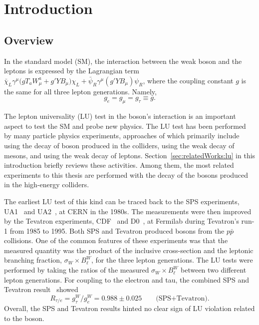 \chapter{Introduction}
\label{sec:introduction}

\section{Overview}
\label{sec:introduction:overview}

In the standard model (SM), the interaction between the weak boson and the leptons is expressed by the Lagrangian term $\bar{\chi}_L \gamma^\mu \big( g T_a W^a_\mu +g'Y B_\mu \big) \chi_L + \bar{\psi}_R \gamma^\mu (g' Y B_\mu) \psi_R $, where the coupling constant $g$ is the same for all three lepton generations. Namely,
\begin{equation*}
	g_e = g_\mu = g_\tau \equiv g.
\end{equation*}

\noindent The lepton universality (LU) test in the \PW boson's interaction is an important aspect to test the SM and probe new physics. The LU test has been performed by many particle physics experiments, approaches of which primarily include using the decay of \PW boson produced in the colliders, using the weak decay of mesons, and using the weak decay of leptons. Section~\ref{sec:relatedWorks:lu} in this introduction briefly reviews these activities. Among them, the most related experiments to this thesis are performed with the decay of the \PW bosons produced in the high-energy colliders.


The earliest LU test of this kind can be traced back to the SPS experiments, UA1~\cite{Albajar:1988ka} and UA2~\cite{appel1986measurement, Alitti:1991eh, Alitti:1992hv}, at CERN in the 1980s. The measurements were then improved by the Tevatron experiments, CDF~\cite{Abazov:2003sv, Abe:1990sd, Abe:1992ys, Abe:1991fb} and D0~\cite{ Abbott:1999tt, Abachi:1995xc, Abbott:1999pk}, at Fermilab during Tevatron's run-1 from 1985 to 1995. Both SPS and Tevatron produced \PW bosons from the $p\bar{p}$ collisions. One of the common features of these experiments was that the measured quantity was the product of the inclusive \PW cross-section and the \PW leptonic branching fraction, $\sigma_W \times B^W_\ell$, for the three lepton generations. The LU tests were performed by taking the ratios of the measured $\sigma_W \times B^W_\ell$ between two different lepton generations. For \PW coupling to the electron and tau, the combined SPS and Tevatron result~\cite{Abbott:1999pk} showed
\begin{equation*}
    R_{\tau/e} = g^W_\tau / g^W_e = 0.988 \pm 0.025 \qquad \text{(SPS+Tevatron)}.
\end{equation*}
\noindent Overall, the SPS and Tevatron results hinted no clear sign of LU violation related to the \PW boson. 



